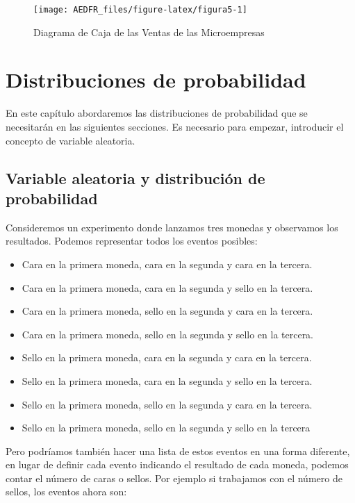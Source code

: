 \documentclass[letterpaper,]{book}
\providecommand{\tightlist}{%
  \setlength{\itemsep}{0pt}\setlength{\parskip}{0pt}}
\begin{document}
\begin{figure}[h!]

{\centering \texttt{[image: AEDFR\_files/figure-latex/figura5-1]} 

}

\caption{Diagrama de Caja de las Ventas de las Microempresas}\label{fig:figura5}
\end{figure}

\hypertarget{distr}{%
\chapter{Distribuciones de probabilidad}\label{distr}}

En este capítulo abordaremos las distribuciones de probabilidad que se necesitarán en las siguientes secciones. Es necesario para empezar, introducir el concepto de variable aleatoria.

\hypertarget{variable-aleatoria-y-distribucion-de-probabilidad}{%
\section{Variable aleatoria y distribución de probabilidad}\label{variable-aleatoria-y-distribucion-de-probabilidad}}

Consideremos un experimento donde lanzamos tres monedas y observamos los resultados. Podemos representar todos los eventos posibles:

\begin{itemize}
\tightlist
\item
  Cara en la primera moneda, cara en la segunda y cara en la tercera.
\item
  Cara en la primera moneda, cara en la segunda y sello en la tercera.
\item
  Cara en la primera moneda, sello en la segunda y cara en la tercera.
\item
  Cara en la primera moneda, sello en la segunda y sello en la tercera.
\item
  Sello en la primera moneda, cara en la segunda y cara en la tercera.
\item
  Sello en la primera moneda, cara en la segunda y sello en la tercera.
\item
  Sello en la primera moneda, sello en la segunda y cara en la tercera.
\item
  Sello en la primera moneda, sello en la segunda y sello en la tercera
\end{itemize}

Pero podríamos también hacer una lista de estos eventos en una forma diferente, en lugar de definir cada evento indicando el resultado de cada moneda, podemos contar el número de caras o sellos. Por ejemplo si trabajamos con el número de sellos, los eventos ahora son:
\end{document}
